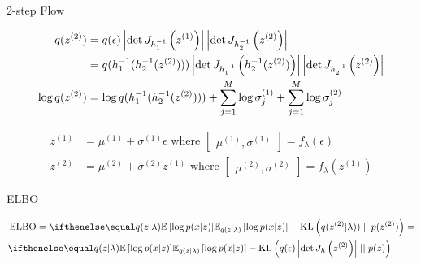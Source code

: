 \documentclass[14pt]{beamer}
\begin{document}
\begin{frame}{2-step Flow}
\begin{small}
\begin{equation*}
\begin{aligned}
q(z^{(2)}) &= q(\epsilon)\left|\det J_{h_{1}^{-1}}\left(z^{(1)}\right)\right|\left|\det J_{h_{2}^{-1}}\left(z^{(2)}\right)\right| \\
&= q(h_{1}^{-1}(h_{2}^{-1}(z^{(2)})))\left|\det J_{h_{1}^{-1}}\left(h_{2}^{-1}(z^{(2)})\right)\right|\left|\det J_{h_{2}^{-1}}\left(z^{(2)}\right)\right| \\
\log q(z^{(2)}) &= \log q(h_{1}^{-1}(h_{2}^{-1}(z^{(2)}))) + \sum_{j=1}^{M}\log\sigma^{(1)}_{j} + \sum_{j=1}^{M}\log\sigma^{(2)}_{j}
\end{aligned}
\end{equation*}
\end{small}
\begin{equation*}
\begin{aligned}
z^{(1)} &= \mu^{(1)} + \sigma^{(1)}\epsilon \text{ where } \begin{bmatrix}\mu^{(1)}, \sigma^{(1)}\end{bmatrix} = f_{\lambda}(\epsilon) \\
z^{(2)} &= \mu^{(2)} + \sigma^{(2)}z^{(1)} \text{ where } \begin{bmatrix}\mu^{(2)}, \sigma^{(2)}\end{bmatrix} = f_{\lambda}(z^{(1)})
\end{aligned}
\end{equation*}
\end{frame}

\begin{frame}{ELBO}
\begin{small}
\begin{equation*}
\begin{aligned}
&\ELBO = \E[q(z|\lambda)]{\log p(x|z)} - \KL{q(z^{(2)}|\lambda))}{p(z^{(2)})} = \\
&\E[q(z|\lambda)]{\log p(x|z)} - \KL{q(\epsilon)\abs{\det\jacob{h}{z^{(2)}}}}{p(z)}
\end{aligned}
\end{equation*}
\end{small}
\end{frame}
\end{document}

